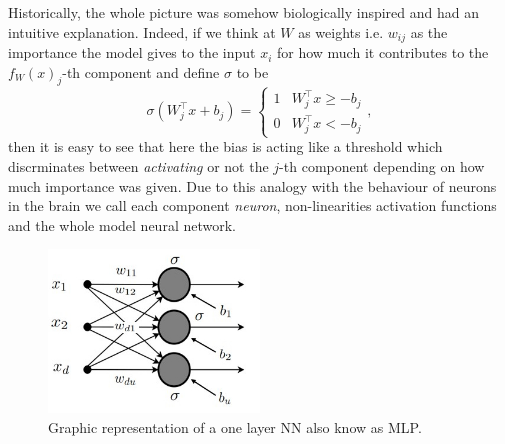 \documentclass[LaM,binding=0.6cm]{./packages/sapthesis/sapthesis}
\begin{document}
            Historically, the whole picture was somehow biologically inspired and had an intuitive explanation. Indeed, if we think at $ W $ as weights i.e. $ w_{ij} $ as the importance
            the model gives to the input $x_i$ for how much it contributes to the $ f_{W}\left(x\right)_j $-th component and define $ \sigma $ to be
            \begin{equation}
                \label{step}
                \sigma(W_j^{\intercal} x + b_j) = \begin{cases} 
                    1 & W_j^{\intercal}x \geq - b_j \\
                    0 & W_j^{\intercal}x < - b_j 
                \end{cases},
            \end{equation}
            then it is easy to see that here the bias is acting like a threshold which discrminates between \textit{activating} or not the $j$-th component depending on how much importance was given. 
            Due to this analogy with the behaviour of neurons in the brain we call each component \textit{neuron}, non-linearities activation functions and the whole model neural network.
            \begin{figure}[h]
                \centering
                \includegraphics[width=0.5\textwidth]{slide1}
                \caption{Graphic representation of a one layer NN also know as MLP.}
            \end{figure}
\end{document}
